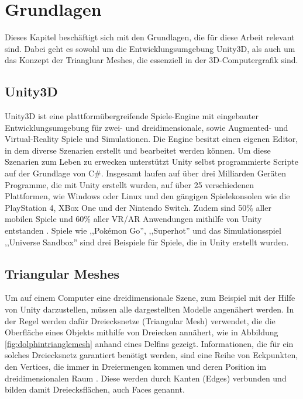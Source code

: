 \section{Grundlagen}
Dieses Kapitel besch\"aftigt sich mit den Grundlagen, die f\"ur diese Arbeit relevant sind. Dabei geht es sowohl um die Entwicklungsumgebung Unity3D, als auch um das Konzept der Triangluar Meshes, die essenziell in der 3D-Computergrafik sind.

\subsection{Unity3D}
Unity3D ist eine plattform\"ubergreifende Spiele-Engine mit eingebauter Entwicklungsumgebung f\"ur zwei- und dreidimensionale, sowie Augmented- und Virtual-Reality Spiele und Simulationen. Die Engine besitzt einen eigenen Editor, in dem diverse Szenarien erstellt und bearbeitet werden k\"onnen. Um diese Szenarien zum Leben zu erwecken unterst\"utzt Unity selbst programmierte Scripte auf der Grundlage von C\#. Insgesamt laufen auf \"uber drei Milliarden Ger\"aten Programme, die mit Unity erstellt wurden, auf \"uber 25 verschiedenen Plattformen, wie Windows oder Linux und den g\"angigen Spielekonsolen wie die PlayStation 4, XBox One und der Nintendo Switch. Zudem sind 50\% aller mobilen Spiele und 60\% aller VR/AR Anwendungen mithilfe von Unity entstanden \cite{Unity}. Spiele wie ,,Pok\'emon Go'', ,,Superhot'' und das Simulationsspiel ,,Universe Sandbox'' sind drei Beispiele f\"ur Spiele, die in Unity erstellt wurden.

\subsection{Triangular Meshes}
Um auf einem Computer eine dreidimensionale Szene, zum Beispiel mit der Hilfe von Unity darzustellen, m\"ussen alle dargestellten Modelle angen\"ahert werden. In der Regel werden daf\"ur Dreiecksnetze (Triangular Mesh) verwendet, die die Oberfl\"ache eines Objekts mithilfe von Dreiecken ann\"ahert, wie in Abbildung \ref{fig:dolphintrianglemesh} anhand eines Delfins gezeigt. Informationen, die f\"ur ein solches Dreiecksnetz garantiert ben\"otigt werden, sind eine Reihe von Eckpunkten, den Vertices, die immer in Dreiermengen kommen und deren Position im dreidimensionalen Raum \cite[S.262]{Shirley2010}. Diese werden durch Kanten (Edges) verbunden und bilden damit Dreiecksfl\"achen, auch Faces genannt.

